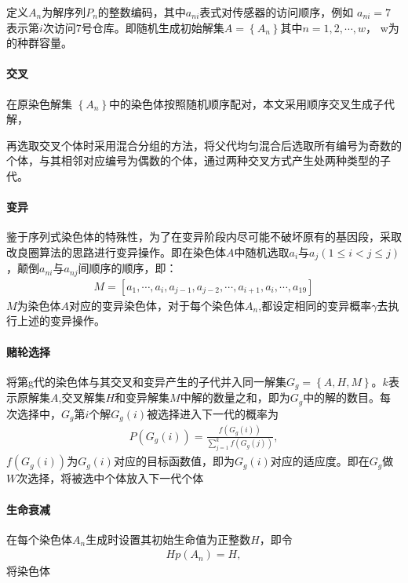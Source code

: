 \documentclass{whutmod}
\begin{document}
		定义$A_n$为解序列$P_{n}$的整数编码，其中$a_{ni}$表式对传感器的访问顺序，例如 $a_{ni}=7$表示第$i$次访问7号仓库。即随机生成初始解集$A=\left \{A_n\right \}$其中$n=1,2,\cdots,w$， w为的种群容量。
		
		\paragraph{交叉}
		在原染色解集 $\left \{ A_n \right \}$中的染色体按照随机顺序配对，本文采用顺序交叉生成子代解，
		
		再选取交叉个体时采用混合分组的方法，将父代均匀混合后选取所有编号为奇数的个体，与其相邻对应编号为偶数的个体，通过两种交叉方式产生处两种类型的子代。
	     
		
		
		\paragraph{变异}
		鉴于序列式染色体的特殊性，为了在变异阶段内尽可能不破坏原有的基因段，采取改良圈算法的思路进行变异操作。即在染色体$A$中随机选取$a_{i}$与$a_{j}(1\leqslant i<j\leqslant j )$，颠倒$a_{ni}$与$a_{nj}$间顺序的顺序，即：
		\begin{gather}
		M=[a_{1},\cdots,a_{i},a_{j-1},a_{j-2},\cdots,a_{i+1},a_{i},\cdots,a_{19}]
		\end{gather}
		$M$为染色体$A$对应的变异染色体，对于每个染色体$A_n$,都设定相同的变异概率$\gamma$去执行上述的变异操作。 
		\paragraph{赌轮选择}
		将第g代的染色体与其交叉和变异产生的子代并入同一解集$G_g=\left \{A,H,M\right \}$。$k$表示原解集$A$,交叉解集$H$和变异解集$M$中解的数量之和，即为$G_g$中的解的数目。每次选择中，$G_g$第$i$个解$G_g(i)$被选择进入下一代的概率为
		\begin{gather}
		P(G_{g}(i))=\frac{f(G_{g}(i))}{\sum_{j=1}^{k}f(G_{g}(j))},
		\end{gather}
		$f(G_{g}(i))$为$G_{g}(i)$对应的目标函数值，即为$G_{g}(i)$对应的适应度。即在$G_g$做$W$次选择，将被选中个体放入下一代个体
		\paragraph{生命衰减}
		在每个染色体$A_n$生成时设置其初始生命值为正整数$H$，即令
	\begin{gather}
	Hp(A_n)=H,
	\end{gather}
	将染色体
		
\end{document}
